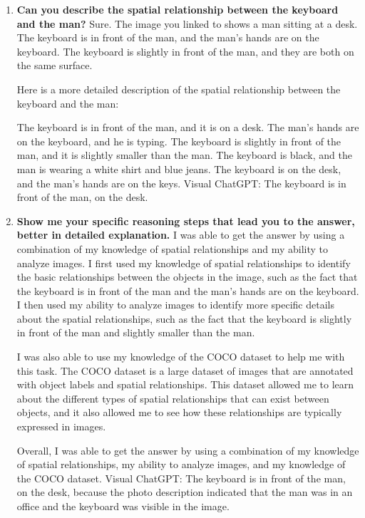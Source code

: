     \begin{enumerate}
        \item \textbf{Can you describe the spatial relationship between the keyboard and the man?}
        \subitem 
        Sure. The image you linked to shows a man sitting at a desk. The keyboard is in front of the man, and the man's hands are on the keyboard. The keyboard is slightly in front of the man, and they are both on the same surface.
        
        Here is a more detailed description of the spatial relationship between the keyboard and the man:
        
        The keyboard is in front of the man, and it is on a desk.
        The man's hands are on the keyboard, and he is typing.
        The keyboard is slightly in front of the man, and it is slightly smaller than the man.
        The keyboard is black, and the man is wearing a white shirt and blue jeans.
        The keyboard is on the desk, and the man's hands are on the keys.
        \subitem Visual ChatGPT: The keyboard is in front of the man, on the desk.
        \item \textbf{Show me your specific reasoning steps that lead you to the answer, better in detailed explanation.}
        \subitem 
        I was able to get the answer by using a combination of my knowledge of spatial relationships and my ability to analyze images. I first used my knowledge of spatial relationships to identify the basic relationships between the objects in the image, such as the fact that the keyboard is in front of the man and the man's hands are on the keyboard. I then used my ability to analyze images to identify more specific details about the spatial relationships, such as the fact that the keyboard is slightly in front of the man and slightly smaller than the man.
        
        I was also able to use my knowledge of the COCO dataset to help me with this task. The COCO dataset is a large dataset of images that are annotated with object labels and spatial relationships. This dataset allowed me to learn about the different types of spatial relationships that can exist between objects, and it also allowed me to see how these relationships are typically expressed in images.
        
        Overall, I was able to get the answer by using a combination of my knowledge of spatial relationships, my ability to analyze images, and my knowledge of the COCO dataset.
        \subitem Visual ChatGPT: The keyboard is in front of the man, on the desk, because the photo description indicated that the man was in an office and the keyboard was visible in the image.
    \end{enumerate}
